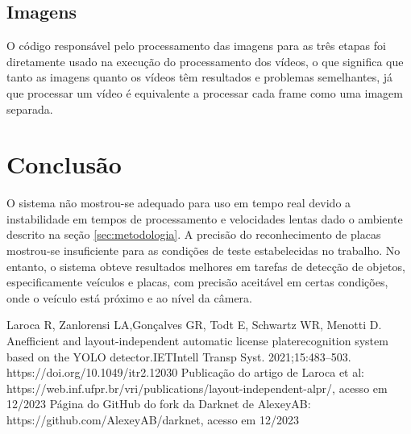 \documentclass[conference]{IEEEtran}
\begin{document}
\subsection{Imagens}
O código responsável pelo processamento das imagens para as três etapas foi diretamente usado na execução do processamento dos vídeos, o que significa que tanto as imagens quanto os vídeos têm resultados e problemas semelhantes, já que processar um vídeo é equivalente a processar cada frame como uma imagem separada.


\section{Conclusão}
\label{sec:conclusao}
O sistema não mostrou-se adequado para uso em tempo real devido a instabilidade em tempos de processamento e velocidades lentas dado o ambiente descrito na seção \ref{sec:metodologia}.
A precisão do reconhecimento de placas mostrou-se insuficiente para as condições de teste estabelecidas no trabalho. No entanto, o sistema obteve resultados melhores em tarefas de detecção de objetos, especificamente veículos e placas, com precisão aceitável em certas condições, onde o veículo está próximo e ao nível da câmera.

\begin{thebibliography}{00}
 Laroca R, Zanlorensi LA,Gonçalves GR, Todt E, Schwartz WR, Menotti D. Anefficient and layout-independent automatic license platerecognition system based on the YOLO detector.IETIntell Transp Syst. 2021;15:483–503. https://doi.org/10.1049/itr2.12030
 Publicação do artigo de Laroca et al: https://web.inf.ufpr.br/vri/publications/layout-independent-alpr/, acesso em 12/2023
 Página do GitHub do fork da Darknet de AlexeyAB: https://github.com/AlexeyAB/darknet, acesso em 12/2023
\end{thebibliography}
\end{document}
